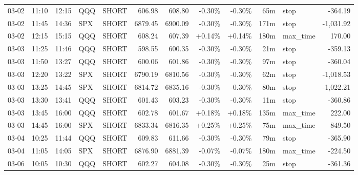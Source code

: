 \documentclass[11pt,a4paper,twoside]{article}
\begin{document}
\begin{center}
\begin{longtable}{>{\color{txtmain}}l l l l l r r r r r >{\color{txtmain}}l r}
03-02 & 11:10 & 12:15 & QQQ & SHORT & 606.98 & 608.80 & \textcolor{lossred}{-0.30\%} & \textcolor{lossred}{-0.30\%} & 65m & stop & \textcolor{lossred}{-364.19} \\
03-02 & 11:45 & 14:36 & SPX & SHORT & 6879.45 & 6900.09 & \textcolor{lossred}{-0.30\%} & \textcolor{lossred}{-0.30\%} & 171m & stop & \textcolor{lossred}{-1,031.92} \\
03-02 & 12:15 & 15:15 & QQQ & SHORT & 608.24 & 607.39 & \textcolor{wingreen}{+0.14\%} & \textcolor{wingreen}{+0.14\%} & 180m & max\_time & \textcolor{wingreen}{170.00} \\
03-03 & 11:25 & 11:46 & QQQ & SHORT & 598.55 & 600.35 & \textcolor{lossred}{-0.30\%} & \textcolor{lossred}{-0.30\%} & 21m & stop & \textcolor{lossred}{-359.13} \\
03-03 & 11:50 & 13:27 & QQQ & SHORT & 600.06 & 601.86 & \textcolor{lossred}{-0.30\%} & \textcolor{lossred}{-0.30\%} & 97m & stop & \textcolor{lossred}{-360.04} \\
03-03 & 12:20 & 13:22 & SPX & SHORT & 6790.19 & 6810.56 & \textcolor{lossred}{-0.30\%} & \textcolor{lossred}{-0.30\%} & 62m & stop & \textcolor{lossred}{-1,018.53} \\
03-03 & 13:25 & 14:45 & SPX & SHORT & 6814.72 & 6835.16 & \textcolor{lossred}{-0.30\%} & \textcolor{lossred}{-0.30\%} & 80m & stop & \textcolor{lossred}{-1,022.21} \\
03-03 & 13:30 & 13:41 & QQQ & SHORT & 601.43 & 603.23 & \textcolor{lossred}{-0.30\%} & \textcolor{lossred}{-0.30\%} & 11m & stop & \textcolor{lossred}{-360.86} \\
03-03 & 13:45 & 16:00 & QQQ & SHORT & 602.78 & 601.67 & \textcolor{wingreen}{+0.18\%} & \textcolor{wingreen}{+0.18\%} & 135m & max\_time & \textcolor{wingreen}{222.00} \\
03-03 & 14:45 & 16:00 & SPX & SHORT & 6833.34 & 6816.35 & \textcolor{wingreen}{+0.25\%} & \textcolor{wingreen}{+0.25\%} & 75m & max\_time & \textcolor{wingreen}{849.50} \\
03-04 & 10:25 & 11:44 & QQQ & SHORT & 609.83 & 611.66 & \textcolor{lossred}{-0.30\%} & \textcolor{lossred}{-0.30\%} & 79m & stop & \textcolor{lossred}{-365.90} \\
03-04 & 11:05 & 14:05 & SPX & SHORT & 6876.90 & 6881.39 & \textcolor{lossred}{-0.07\%} & \textcolor{lossred}{-0.07\%} & 180m & max\_time & \textcolor{lossred}{-224.50} \\
03-06 & 10:05 & 10:30 & QQQ & SHORT & 602.27 & 604.08 & \textcolor{lossred}{-0.30\%} & \textcolor{lossred}{-0.30\%} & 25m & stop & \textcolor{lossred}{-361.36} \\

\end{longtable}
\end{center}
\end{document}
